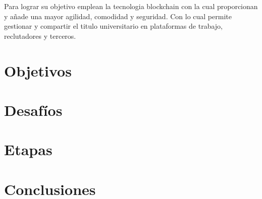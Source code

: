 \documentclass[11pt,a4paper]{article}
\begin{document}
        Para lograr su objetivo emplean la tecnologia blockchain con la cual proporcionan y añade una mayor agilidad,
        comodidad y seguridad. Con lo cual permite gestionar y compartir el titulo universitario en plataformas de trabajo, 
        reclutadores y terceros.


    \section{Objetivos}

    \section{Desafíos}

    \section{Etapas}

    \section{Conclusiones}
\end{document}
